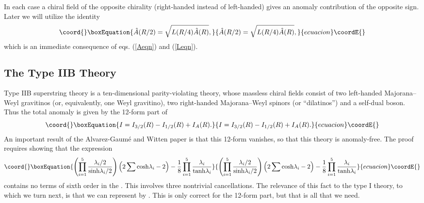 \documentclass[a4paper,12pt]{article}
\begin{document}
In each case a chiral field of the opposite chirality
(right-handed instead of left-handed) gives an anomaly
contribution of the opposite sign. Later we will utilize the
identity\cite{Scrucca:1999jq}
\begin{equation}\coord{}\boxEquation{ \label{magiceq}
\hat A(R/2) = \sqrt{L(R/4) \hat A (R)},
}{ \hat A(R/2) = \sqrt{L(R/4) \hat A (R)},
}{ecuacion}\coordE{}\end{equation}
which is an immediate consequence of eqs. (\ref{Aeqn}) and
(\ref{Leqn}).

\subsection{The Type IIB Theory}

Type IIB superstring theory is a ten-dimensional parity-violating
theory, whose massless chiral fields consist of two left-handed
Majorana--Weyl gravitinos (or, equivalently, one Weyl gravitino),
two right-handed Majorana--Weyl spinors (or ``dilatinos'') and a
self-dual boson. Thus the total anomaly is given by the 12-form
part of
\begin{equation}\coord{}\boxEquation{
I = I_{3/2}(R) - I_{1/2}(R) + I_A (R).
}{
I = I_{3/2}(R) - I_{1/2}(R) + I_A (R).
}{ecuacion}\coordE{}\end{equation}
An important result of the Alvarez-Gaum\'e and Witten paper
\cite{Alvarez-Gaume:1984ig} is that this 12-form vanishes, so that
this theory is anomaly-free. The proof requires showing that the
expression
\begin{equation}\coord{}\boxEquation{
\left( \prod_{i=1}^5 {\lambda_i/2 \over {\rm sinh} \lambda_i /2}
\right) \left( 2\sum {\rm cosh} \lambda_i -2 \right) - {1 \over 8}
\prod_{i=1}^5 {\lambda_i \over {\rm tanh} \lambda_i}
}{
\left( \prod_{i=1}^5 {\lambda_i/2 \over {\rm sinh} \lambda_i /2}
\right) \left( 2\sum {\rm cosh} \lambda_i -2 \right) - {1 \over 8}
\prod_{i=1}^5 {\lambda_i \over {\rm tanh} \lambda_i}
}{ecuacion}\coordE{}\end{equation}
contains no terms of sixth order in the \coordHE{}. This involves
three nontrivial cancellations. The relevance of this fact to the
type I theory, to which we turn next, is that we can represent
\coordHE{} by \coordHE{}. This is only correct for
the 12-form part, but that is all that we need.
\end{document}
